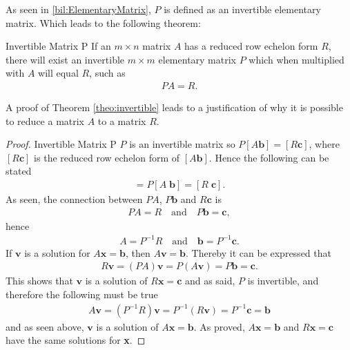 As seen in \autoref{bil:ElementaryMatrix}, $P$ is defined as an invertible elementary matrix. Which leads to the following theorem:

\begin{theorem}{Invertible Matrix P} \label{the:PMatrix}
    If an $m \times n$ matrix $A$ has a reduced row echelon form $R$, there will exist an invertible $m \times m$ elementary matrix $P$ which when multiplied with $A$ will equal $R$, such as
    \begin{align*}
        PA=R.
    \end{align*}
    \cite[127]{LiAl}
    \label{theo:invertible}
\end{theorem}
A proof of Theorem \ref{theo:invertible} leads to a justification of why it is possible to reduce a matrix $A$ to a matrix $R$.
\begin{proof}{Invertible Matrix P}
    $P$ is an invertible matrix so $P[A\mathbf{b}]=[R\mathbf{c}]$, where $[R\mathbf{c}]$ is the reduced row echelon form of $[A\mathbf{b}]$. 
    Hence the following can be stated
    \begin{align*}
        [PA\;P\mathbf{b}]=P[A\;\mathbf{b}]=[R\;\mathbf{c}].
    \end{align*}
    As seen, the connection between $PA$, $P\mathbf{b}$ and $R\mathbf{c}$ is
    \begin{align*}
        PA=R \quad\text{and}\quad P\mathbf{b}=\mathbf{c},
    \end{align*}
    hence
    \begin{align*}
        A = P^{-1}R \quad \text{and} \quad \mathbf{b} = P^{-1}\mathbf{c}.
    \end{align*}
    If $\mathbf{v}$ is a solution for $A\mathbf{x}=\mathbf{b}$, then $A\mathbf{v}=\mathbf{b}$. Thereby it can be expressed that 
    \begin{align*}
        R\mathbf{v}=(PA)\mathbf{v}=P(A\mathbf{v})=P\mathbf{b}=\mathbf{c}.
    \end{align*}
    This shows that $\mathbf{v}$ is a solution of $R\mathbf{x}=\mathbf{c}$
    and as said, $P$ is invertible, and therefore the following must be true
    \begin{align*}
        A\mathbf{v}=(P^{-1}R)\mathbf{v}=P^{-1}(R\mathbf{v})=P^{-1}\mathbf{c}=\mathbf{b}
    \end{align*}
    and as seen above, $\mathbf{v}$ is a solution of $A\mathbf{x}=\mathbf{b}$. As proved, $A\mathbf{x}=\mathbf{b}$ and $R\mathbf{x}=\mathbf{c}$ have the same solutions for \textbf{x}. \qedsymbol
\end{proof}

